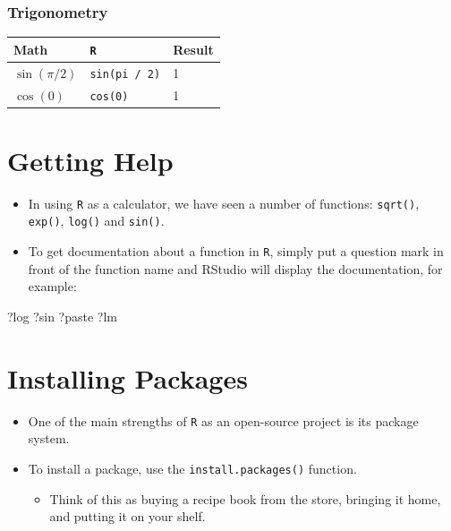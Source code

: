 \documentclass[]{book}
\newenvironment{Shaded}{\begin{snugshade}}{\end{snugshade}}
\newcommand{\NormalTok}[1]{#1}
\providecommand{\tightlist}{%
  \setlength{\itemsep}{0pt}\setlength{\parskip}{0pt}}
\begin{document}
\subsubsection*{Trigonometry}\label{trigonometry}

\begin{longtable}[]{@{}lll@{}}
\toprule
Math & \texttt{R} & Result\tabularnewline
\midrule
\endhead
\(\sin(\pi / 2)\) & \texttt{sin(pi\ /\ 2)} & 1\tabularnewline
\(\cos(0)\) & \texttt{cos(0)} & 1\tabularnewline
\bottomrule
\end{longtable}

\section{Getting Help}\label{getting-help}

\begin{itemize}
\tightlist
\item
  In using \texttt{R} as a calculator, we have seen a number of
  functions: \texttt{sqrt()}, \texttt{exp()}, \texttt{log()} and
  \texttt{sin()}.
\item
  To get documentation about a function in \texttt{R}, simply put a
  question mark in front of the function name and RStudio will display
  the documentation, for example:
\end{itemize}

\begin{Shaded}
\begin{Highlighting}[]
\NormalTok{?log}
\NormalTok{?sin}
\NormalTok{?paste}
\NormalTok{?lm}
\end{Highlighting}
\end{Shaded}

\section{Installing Packages}\label{installing-packages}

\begin{itemize}
\tightlist
\item
  One of the main strengths of \texttt{R} as an open-source project is
  its package system.
\item
  To install a package, use the \texttt{install.packages()} function.

  \begin{itemize}
  \tightlist
  \item
    Think of this as buying a recipe book from the store, bringing it
    home, and putting it on your shelf.
  \end{itemize}
\end{itemize}
\end{document}
